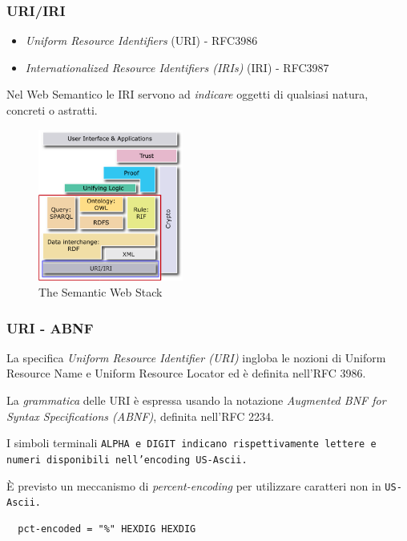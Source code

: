\documentclass[8pt]{beamer}
\begin{document}
\begin{frame}
	\frametitle{URI/IRI}
	
	\begin{itemize}
	  \item \emph{Uniform Resource Identifiers} (URI) - RFC3986
	  \item \emph{Internationalized Resource Identifiers (IRIs)} (IRI) - RFC3987
	\end{itemize}	
	
	Nel Web Semantico le IRI servono ad \emph{indicare} oggetti di qualsiasi
	natura, concreti o astratti.
	
	\begin{figure}
	    \includegraphics[width=180px]{imgs/Semantic_Web_Stack_uri.png}
	    \caption{The Semantic Web Stack} 
	\end{figure}
\end{frame}

\begin{frame}[fragile]
	\frametitle{URI - ABNF}
	La specifica \emph{Uniform Resource Identifier (URI)} ingloba
	le nozioni di Uniform Resource Name e Uniform Resource Locator
	ed \`e definita nell'RFC 3986.
	\vspace{\baselineskip}
	
	La \emph{grammatica} delle URI \`e espressa usando la notazione
	\emph{Augmented BNF for Syntax Specifications (ABNF)}, definita
	nell'RFC 2234. 
	\vspace{\baselineskip}

	I simboli terminali \tt{ALPHA} e \tt{DIGIT} indicano rispettivamente
	lettere e numeri disponibili nell'encoding \tt{US-Ascii}.
	\vspace{\baselineskip}
	
	\`E previsto un meccanismo di \emph{percent-encoding} per utilizzare
	caratteri non in \tt{US-Ascii}.
	
	\begin{verbatim}
  pct-encoded = "%" HEXDIG HEXDIG	
	\end{verbatim}	
	
\end{frame}
\end{document}
